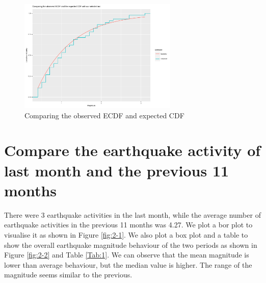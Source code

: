 \documentclass[11pt]{article}
\begin{document}
\begin{CJK}{UTF8}{gbsn}
\begin{figure}[h]
  \centering
  \includegraphics[height=5.4cm]{../../outputs/com_cdf_plot.png}
  \caption{Comparing the observed ECDF and expected CDF}
  \label{fig:s2}
\end{figure}



\section*{Compare the earthquake activity of last month and the previous 11 months}

There were 3 earthquake activities in the last month, while the average number of earthquake activities in the previous 11 months was 4.27. We plot a bor plot to visualise it as shown in Figure \ref{fig:2-1}. We also plot a box plot and a table to show the overall earthquake magnitude behaviour of the two periods as shown in Figure \ref{fig:2-2} and Table \ref{Tab:1}. We can observe that the mean magnitude is lower than average behaviour, but the median value is higher. The range of the magnitude seems similar to the previous.



\end{CJK}
\end{document}

